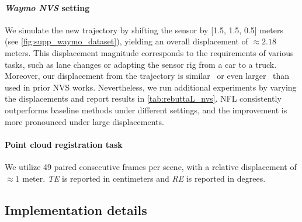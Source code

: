 \paragraph{\textit{Waymo NVS} setting} 
We simulate the new trajectory by shifting the sensor by [1.5, 1.5, 0.5] meters (see \cref{fig:supp_waymo_dataset}), yielding an overall displacement of ${\approx}2.18$ meters. This displacement magnitude corresponds to the requirements of various tasks, such as lane changes or adapting the sensor rig from a car to a truck. Moreover, our displacement from the trajectory is similar~\cite{Yang_2023_unisim} or even larger~\cite{Ost_2022_CVPR} than used in prior NVS works. Nevertheless, we run additional experiments by varying the displacements and report results in \cref{tab:rebuttaL_nvs}. NFL consistently outperforms baseline methods under different settings, and the improvement is more pronounced under large displacements.

\begin{table}[t]
    \setlength{\tabcolsep}{6pt}
    \renewcommand{\arraystretch}{1.2}
	\centering
    \caption{Varying the displacement on \textit{Waymo NVS} dataset. Numbers are reported as \textit{MedAE} / \textit{CD} [cm].}
    \label{tab:rebuttaL_nvs}
\end{table}

\paragraph{Point cloud registration task}
We utilize 49 paired consecutive frames per scene, with a relative displacement of ${\approx}1$ meter. \textit{TE} is reported in centimeters and \textit{RE} is reported in degrees.


\subsection{Implementation details}
